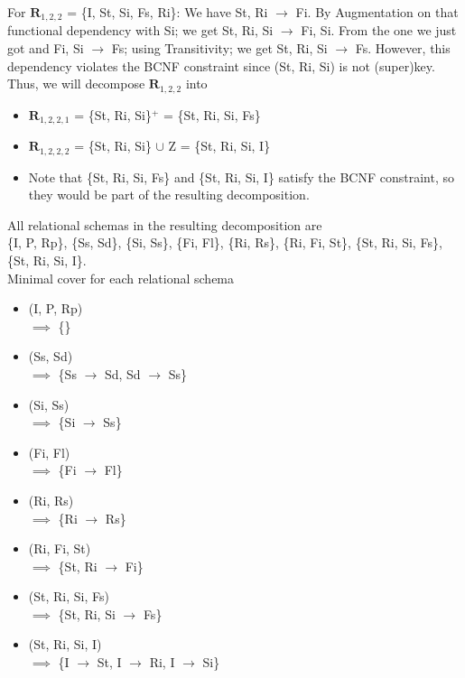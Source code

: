 \documentclass[12pt]{article}
\begin{document}
\begin{enumerate}
        For $\textbf{R}_{1,2,2}$ = \{I, St, Si, Fs, Ri\}: We have St, Ri
        $\longrightarrow$ Fi. By Augmentation on that functional dependency with
        Si; we get St, Ri, Si $\longrightarrow$ Fi, Si. From the one we just got
        and Fi, Si $\longrightarrow$ Fs; using Transitivity; we get St, Ri, Si
        $\longrightarrow$ Fs. However, this dependency violates the BCNF
        constraint since (St, Ri, Si) is not (super)key. Thus, we will decompose 
        $\textbf{R}_{1,2,2}$ into
        \begin{itemize}
          \item $\textbf{R}_{1,2,2,1}$ = \{St, Ri, Si\}$^+$
                                       = \{St, Ri, Si, Fs\}
          \item $\textbf{R}_{1,2,2,2}$ = \{St, Ri, Si\} $\cup$ Z
                                       = \{St, Ri, Si, I\}
          \item Note that \{St, Ri, Si, Fs\} and \{St, Ri, Si, I\} satisfy the
                BCNF constraint, so they would be part of the resulting
                decomposition.
        \end{itemize}

        All relational schemas in the resulting decomposition are \\
        \{I, P, Rp\}, \{Ss, Sd\}, \{Si, Ss\}, \{Fi, Fl\}, \{Ri, Rs\}, \{Ri, Fi,
        St\}, \{St, Ri, Si, Fs\}, \{St, Ri, Si, I\}. \\

        Minimal cover for each relational schema
        \begin{itemize}
          \item (I, P, Rp) \\
                $\implies$ \{\}
          \item (Ss, Sd) \\
                $\implies$ \{Ss $\longrightarrow$ Sd, Sd $\longrightarrow$ Ss\}
          \item (Si, Ss) \\
                $\implies$ \{Si $\longrightarrow$ Ss\}
          \item (Fi, Fl) \\
                $\implies$ \{Fi $\longrightarrow$ Fl\}
          \item (Ri, Rs) \\
                $\implies$ \{Ri $\longrightarrow$ Rs\}
          \item (Ri, Fi, St) \\
                $\implies$ \{St, Ri $\longrightarrow$ Fi\}
          \item (St, Ri, Si, Fs) \\
                $\implies$ \{St, Ri, Si $\longrightarrow$ Fs\}
          \item (St, Ri, Si, I) \\
                $\implies$ \{I $\longrightarrow$ St, I $\longrightarrow$ Ri, I
                            $\longrightarrow$ Si\}
        \end{itemize}


\end{enumerate}
\end{document}
